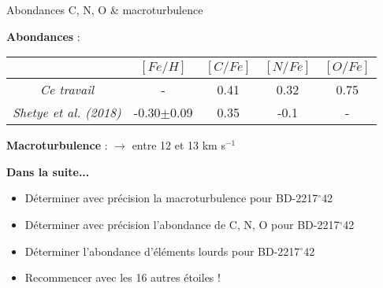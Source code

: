 \documentclass[10pt]{beamer}
\begin{document}
\begin{frame}[fragile]{Abondances C, N, O \& macroturbulence}

\textbf{Abondances} : 
	\begin{table}
    		\begin{tabular}{c|cccc}
      		\toprule
			\midrule
       		&$[Fe/H]$ & $[C/Fe]$ & $[N/Fe]$&$ [O/Fe]$\\
      		\midrule
			\textit{Ce travail} & - & 0.41 &0.32 & 0.75  \\
      		\textit{Shetye et al. (2018)} &-0.30$\pm$0.09& 0.35 &-0.1 &-  \\
			      		\bottomrule
    		\end{tabular}
	  \end{table}


\textbf{Macroturbulence} : $\rightarrow$ entre 12 et 13 km s$^{-1}$ \newline

\textbf{\large Dans la suite...}
\begin{itemize}
\item Déterminer avec précision la macroturbulence pour BD-2217$^{\circ}$42
\item Déterminer avec précision l'abondance de C, N, O pour BD-2217$^{\circ}$42
\item Déterminer l'abondance d'éléments lourds pour BD-2217$^{\circ}$42
\item Recommencer avec les 16 autres étoiles !
\end{itemize}

\end{frame}


%
%
%
%
%
\end{document}
